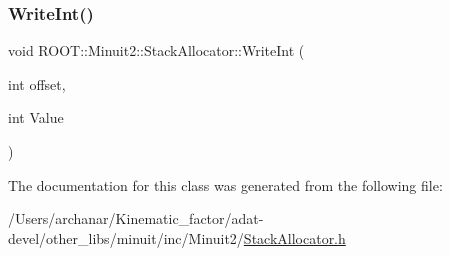 \subsubsection{\texorpdfstring{WriteInt()}{WriteInt()}\hspace{0.1cm}{\footnotesize\ttfamily [3/3]}}
{\footnotesize\ttfamily void R\+O\+O\+T\+::\+Minuit2\+::\+Stack\+Allocator\+::\+Write\+Int (\begin{DoxyParamCaption}\item[{int}]{offset,  }\item[{int}]{Value }\end{DoxyParamCaption})\hspace{0.3cm}{\ttfamily [inline]}}



The documentation for this class was generated from the following file\+:\begin{DoxyCompactItemize}
\item 
/\+Users/archanar/\+Kinematic\+\_\+factor/adat-\/devel/other\+\_\+libs/minuit/inc/\+Minuit2/\mbox{\hyperlink{adat-devel_2other__libs_2minuit_2inc_2Minuit2_2StackAllocator_8h}{Stack\+Allocator.\+h}}\end{DoxyCompactItemize}
